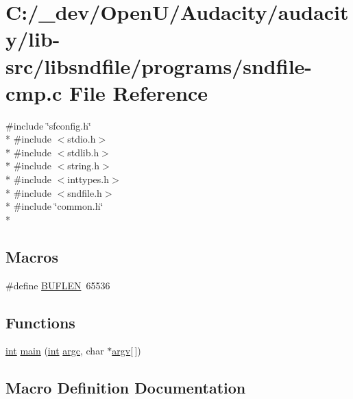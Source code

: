 \hypertarget{sndfile-cmp_8c}{}\section{C\+:/\+\_\+dev/\+Open\+U/\+Audacity/audacity/lib-\/src/libsndfile/programs/sndfile-\/cmp.c File Reference}
\label{sndfile-cmp_8c}
{\ttfamily \#include \char`\"{}sfconfig.\+h\char`\"{}}\\*
{\ttfamily \#include $<$stdio.\+h$>$}\\*
{\ttfamily \#include $<$stdlib.\+h$>$}\\*
{\ttfamily \#include $<$string.\+h$>$}\\*
{\ttfamily \#include $<$inttypes.\+h$>$}\\*
{\ttfamily \#include $<$sndfile.\+h$>$}\\*
{\ttfamily \#include \char`\"{}common.\+h\char`\"{}}\\*
\subsection*{Macros}
\begin{DoxyCompactItemize}
\item 
\#define \hyperlink{sndfile-cmp_8c_ad974fe981249f5e84fbf1683b012c9f8}{B\+U\+F\+L\+EN}~65536
\end{DoxyCompactItemize}
\subsection*{Functions}
\begin{DoxyCompactItemize}
\item 
\hyperlink{xmltok_8h_a5a0d4a5641ce434f1d23533f2b2e6653}{int} \hyperlink{sndfile-cmp_8c_a0ddf1224851353fc92bfbff6f499fa97}{main} (\hyperlink{xmltok_8h_a5a0d4a5641ce434f1d23533f2b2e6653}{int} \hyperlink{cmdline_8c_aaffeb1bf2056ea44af5b5d0ee4d6ff07}{argc}, char $\ast$\hyperlink{cmdline_8c_ad407d5ba91709bd9b092003858600723}{argv}\mbox{[}$\,$\mbox{]})
\end{DoxyCompactItemize}


\subsection{Macro Definition Documentation}
